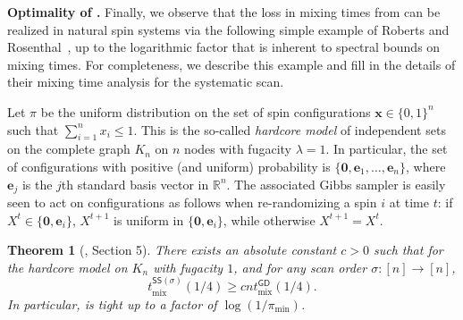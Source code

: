 \documentclass[11pt]{article}
\newtheorem{theorem}{Theorem}[section]
\begin{document}
    \noindent\textbf{Optimality of .}
    Finally, we observe that the loss in mixing times from  can be realized in natural spin systems via the following simple example of Roberts and Rosenthal~\cite{roberts2015surprising}, up to the logarithmic factor that is inherent to spectral bounds on mixing times. For completeness, we describe this example and fill in the details of their mixing time analysis for the systematic scan. 
    
    Let $\pi$ be the uniform distribution on the set of spin configurations $\bm{x}\in \{0,1\}^n$ such that $\sum_{i=1}^n x_i\leq 1$. This is the so-called \emph{hardcore model} of independent sets on the complete graph $K_n$ on $n$ nodes with fugacity $\lambda=1$. In particular, the set of configurations with positive (and uniform) probability is $\{\bm{0},\bm{e}_1,\ldots,\bm{e}_n\}$, where $\bm{e}_j$ is the $j$th standard basis vector in $\mathbb{R}^n$. The associated Gibbs sampler is easily seen to act on configurations as follows when re-randomizing a spin $i$ at time $t$: if $X^t\in \{\bm{0},\bm{e}_i\}$, $X^{t+1}$ is uniform in $\{\bm{0},\bm{e}_i\}$, while otherwise $X^{t+1}=X^t$.

    \begin{theorem}[\cite{roberts2015surprising}, Section 5]
        There exists an absolute constant $c>0$ such that for the hardcore model on $K_n$ with fugacity $1$, and for any scan order $\sigma:[n]\to [n]$,
        \begin{equation*}
            t^{\mathsf{SS}(\sigma)}_{\mathrm{mix}}(1/4)\geq cnt^{\mathsf{GD}}_{\mathrm{mix}}(1/4).
        \end{equation*}
        In particular,  is tight up to a factor of $\log(1/\pi_{\mathrm{min}})$.
    \end{theorem}
\end{document}
